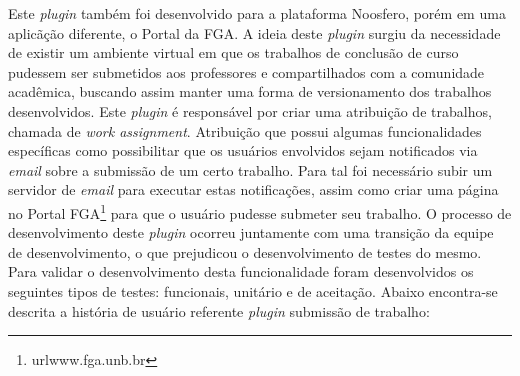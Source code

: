 Este \textit{plugin} também foi desenvolvido para a plataforma Noosfero, porém em uma aplicãção diferente, o Portal da FGA. A ideia deste \textit{plugin} surgiu da necessidade de existir um ambiente virtual em que os trabalhos de conclusão de curso pudessem ser submetidos aos professores e compartilhados com a comunidade acadêmica, buscando assim manter uma forma de versionamento dos trabalhos desenvolvidos.
%
Este \textit{plugin} é responsável por criar uma atribuição de trabalhos, chamada de \textit{work assignment}. Atribuição que possui algumas funcionalidades específicas como possibilitar que os usuários envolvidos sejam notificados via \textit{email} sobre a submissão de um certo trabalho. Para tal foi necessário subir um servidor de \textit{email} para executar estas notificações, assim como criar uma página no Portal FGA\footnote{url{www.fga.unb.br}} para que o usuário pudesse submeter seu trabalho.
%
O processo de desenvolvimento deste \textit{plugin} ocorreu juntamente com uma transição da equipe de desenvolvimento, o que prejudicou o desenvolvimento de testes do mesmo.
%
Para validar o desenvolvimento desta funcionalidade foram desenvolvidos os seguintes tipos de testes: funcionais, unitário e de aceitação. Abaixo encontra-se descrita a história de usuário referente \textit{plugin} submissão de trabalho:
